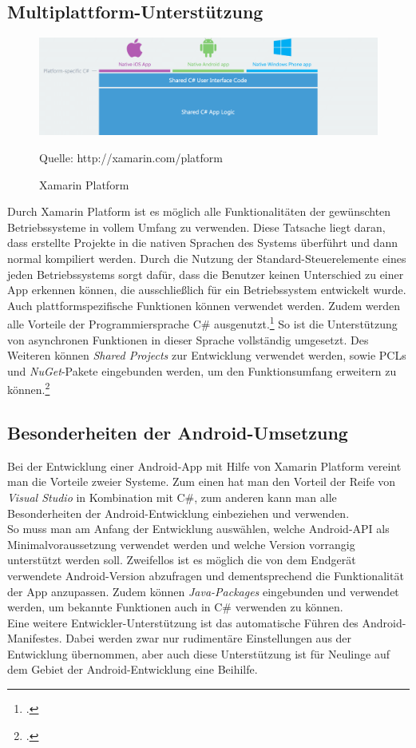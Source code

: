\subsection{Multiplattform-Unterstützung}
\label{ssec:xamarin-multiplattform}

\begin{figure}[!h]
\centering
\includegraphics[width=\linewidth]{content/images/Xamarin-Platform}
\caption{Xamarin Platform}
Quelle: http://xamarin.com/platform
\label{pic:xamarinPlatform}
\end{figure}

Durch Xamarin Platform ist es möglich alle Funktionalitäten der gewünschten Betriebssysteme in vollem Umfang zu verwenden. Diese Tatsache liegt daran, dass erstellte Projekte in die nativen Sprachen des Systems überführt und dann normal kompiliert werden. Durch die Nutzung der Standard-Steuerelemente eines jeden Betriebssystems sorgt dafür, dass die Benutzer keinen Unterschied zu einer App erkennen können, die ausschließlich für ein Betriebssystem entwickelt wurde. Auch plattformspezifische Funktionen können verwendet werden. Zudem werden alle Vorteile der Programmiersprache C\# ausgenutzt.\footcite{Xamarin-Platform} So ist die Unterstützung von asynchronen Funktionen in dieser Sprache vollständig umgesetzt. Des Weiteren können \textit{Shared Projects} zur Entwicklung verwendet werden, sowie \ac{PCL}s und \textit{\gls{NuGet}}-Pakete eingebunden werden, um den Funktionsumfang erweitern zu können.\footcite{Xamarin-Multiplatform}
\subsection{Besonderheiten der Android-Umsetzung}
\label{ssec:xamarin-android}
Bei der Entwicklung einer Android-App mit Hilfe von Xamarin Platform vereint man die Vorteile zweier Systeme. Zum einen hat man den Vorteil der Reife von \textit{Visual Studio} in Kombination mit C\#, zum anderen kann man alle Besonderheiten der Android-Entwicklung einbeziehen und verwenden.\\
So muss man am Anfang der Entwicklung auswählen, welche Android-\ac{API} als Minimalvoraussetzung verwendet werden  und welche Version vorrangig unterstützt werden soll. Zweifellos ist es möglich die von dem Endgerät verwendete Android-Version abzufragen und dementsprechend die Funktionalität der App anzupassen.
Zudem können \textit{Java-Packages} eingebunden und verwendet werden, um bekannte Funktionen auch in C\# verwenden zu können.\\
Eine weitere Entwickler-Unterstützung ist das automatische Führen des Android-Manifestes. Dabei werden zwar nur rudimentäre Einstellungen aus der Entwicklung übernommen, aber auch diese Unterstützung ist für Neulinge auf dem Gebiet der Android-Entwicklung eine Beihilfe.
